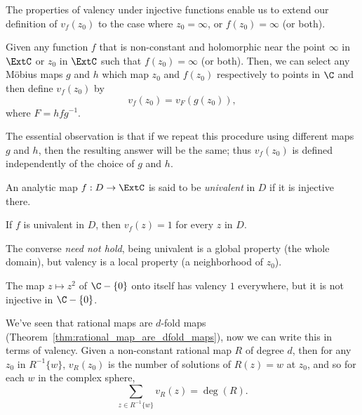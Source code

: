 The properties of valency under injective functions enable us to extend our
definition of $v_f(z_0)$ to the case where $z_0 = \infty$, or $f(z_0) = \infty$
(or both).

\begin{definition}
    \label{def:valency_in_ExtC}
    Given any function $f$ that is non-constant and holomorphic near the point
    $\infty$ in $\ExtC$ or $z_0$ in $\ExtC$ such that $f(z_0) = \infty$ (or
    both). Then, we can select any Möbius maps $g$ and $h$ which map $z_0$ and
    $f(z_0)$ respectively to points in $\C$ and then define $v_f(z_0)$ by
    \[
        v_f(z_0) = v_F(g(z_0)),
    \]
    where $F = hfg^{-1}$.
\end{definition}

The essential observation is that if we repeat this procedure using different
maps $g$ and $h$, then the resulting answer will be the same; thus $v_f(z_0)$ is
defined independently of the choice of $g$ and $h$.

\begin{definition}
    An analytic map $f : D \to \ExtC$ is said to be \emph{univalent} in $D$ if
    it is injective there.
\end{definition}

\begin{remark}[$f$ univalent $\implies v_f(z) = 1 \forall z \in D$]
    If $f$ is univalent in $D$, then $v_f(z) = 1$ for every $z$ in $D$.
\end{remark}

The converse \emph{need not hold}, being univalent is a global property (the
whole domain), but valency is a local property (a neighborhood of $z_0$).

\begin{example}
    The map $z \mapsto z^2$ of $\C - \{0\}$ onto itself has valency $1$
    everywhere, but it is not injective in $\C - \{0\}$.
\end{example}

\begin{remark}
    We've seen that rational maps are $d$-fold maps
    (Theorem~\ref{thm:rational_map_are_dfold_maps}), now we can write this in
    terms of valency. Given a non-constant rational map $R$ of degree $d$, then
    for any $z_0$ in $R^{-1}\{w\}$, $v_R(z_0)$ is the number of solutions of
    $R(z) = w$ at $z_0$, and so for each $w$ in the complex sphere,
    \[
        \sum_{z \in R^{-1}\{w\}} v_R(z) = \deg(R).
    \]
\end{remark}

